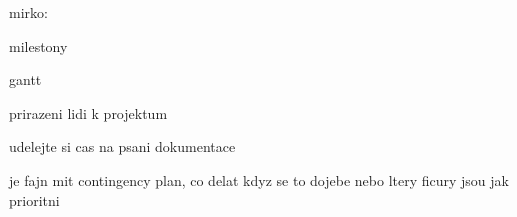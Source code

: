 \restoregeometry

mirko:

milestony

gantt

prirazeni lidi k projektum

udelejte si cas na psani dokumentace

je fajn mit contingency plan, co delat kdyz se to dojebe nebo ltery ficury jsou jak prioritni
